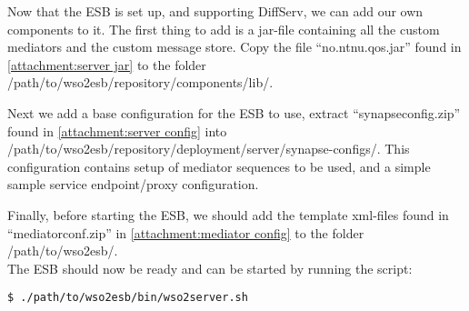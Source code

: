 	Now that the ESB is set up, and supporting DiffServ, we can add our own components to it. The first thing to add is a jar-file containing all the custom mediators and the custom message store. Copy the file “no.ntnu.qos.jar” found in \ref{attachment:server jar} to the folder /path/to/wso2esb/repository/components/lib/.
	
	Next we add a base configuration for the ESB to use, extract “synapseconfig.zip” found in \ref{attachment:server config} into /path/to/wso2esb/repository/deployment/server/synapse-configs/. This configuration contains setup of mediator sequences to be used, and a simple sample service endpoint/proxy configuration.
	
	Finally, before starting the ESB, we should add the template xml-files found in “mediatorconf.zip” in \ref{attachment:mediator config} to the folder /path/to/wso2esb/.\\

	The ESB should now be ready and can be started by running the script:\\
\begin{lstlisting}[frame=single, label=run esb server, breaklines=true]
$ ./path/to/wso2esb/bin/wso2server.sh
\end{lstlisting}
